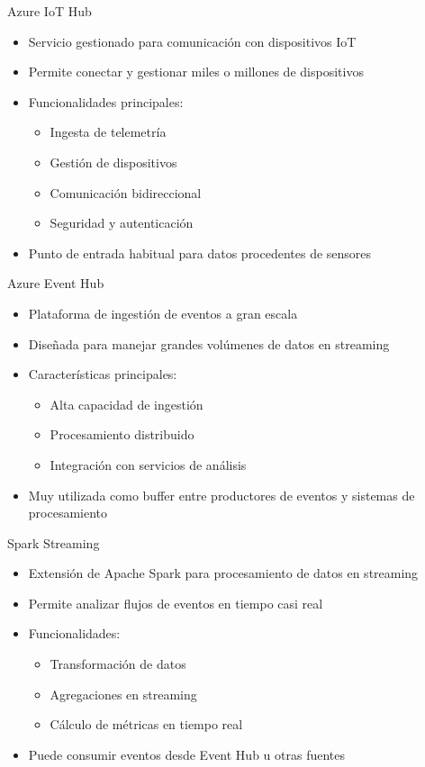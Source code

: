 \documentclass{beamer}
\begin{document}
\begin{frame}{Azure IoT Hub}
\begin{itemize}
    \item Servicio gestionado para comunicación con dispositivos IoT
    \item Permite conectar y gestionar miles o millones de dispositivos
    \item Funcionalidades principales:
    \begin{itemize}
        \item Ingesta de telemetría
        \item Gestión de dispositivos
        \item Comunicación bidireccional
        \item Seguridad y autenticación
    \end{itemize}
    \item Punto de entrada habitual para datos procedentes de sensores
\end{itemize}
\end{frame}

\begin{frame}{Azure Event Hub}
\begin{itemize}
    \item Plataforma de ingestión de eventos a gran escala
    \item Diseñada para manejar grandes volúmenes de datos en streaming
    \item Características principales:
    \begin{itemize}
        \item Alta capacidad de ingestión
        \item Procesamiento distribuido
        \item Integración con servicios de análisis
    \end{itemize}
    \item Muy utilizada como buffer entre productores de eventos y sistemas de procesamiento
\end{itemize}
\end{frame}

\begin{frame}{Spark Streaming}
\begin{itemize}
    \item Extensión de Apache Spark para procesamiento de datos en streaming
    \item Permite analizar flujos de eventos en tiempo casi real
    \item Funcionalidades:
    \begin{itemize}
        \item Transformación de datos
        \item Agregaciones en streaming
        \item Cálculo de métricas en tiempo real
    \end{itemize}
    \item Puede consumir eventos desde Event Hub u otras fuentes
\end{itemize}
\end{frame}
\end{document}
